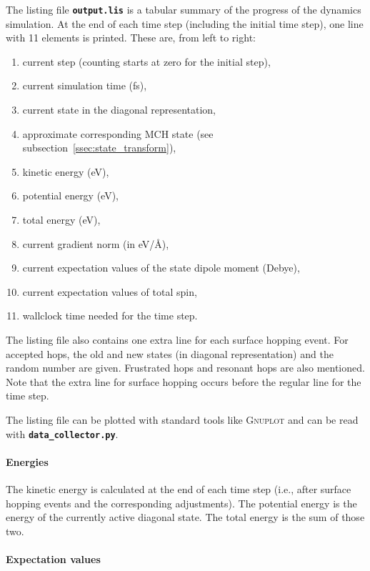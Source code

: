 \documentclass[a4paper,10pt,DIV=15,openany,twoside=false]{scrbook}
\newcommand{\ttt}[1]{\textbf{\texttt{#1}}}
\begin{document}
The listing file \ttt{output.lis} is a tabular summary of the progress of the dynamics simulation. At the end of each time step (including the initial time step), one line with 11 elements is printed. These are, from left to right:
\begin{enumerate}
  \item current step (counting starts at zero for the initial step),
  \item current simulation time (fs),
  \item current state in the diagonal representation,
  \item approximate corresponding MCH state (see subsection~\ref{ssec:state_transform}),
  \item kinetic energy (eV),
  \item potential energy (eV),
  \item total energy (eV),
  \item current gradient norm (in eV/\AA),
  \item current expectation values of the state dipole moment (Debye),
  \item current expectation values of total spin,
  \item wallclock time needed for the time step.
\end{enumerate}
The listing file also contains one extra line for each surface hopping event. For accepted hops, the old and new states (in diagonal representation) and the random number are given. Frustrated hops and resonant hops are also mentioned. Note that the extra line for surface hopping occurs before the regular line for the time step. 

The listing file can be plotted with standard tools like \textsc{Gnuplot} and can be read with \ttt{data\_collector.py}. 

\paragraph{Energies}

The kinetic energy is calculated at the end of each time step (i.e., after surface hopping events and the corresponding adjustments). The potential energy is the energy of the currently active diagonal state. The total energy is the sum of those two.

\paragraph{Expectation values}
\end{document}
